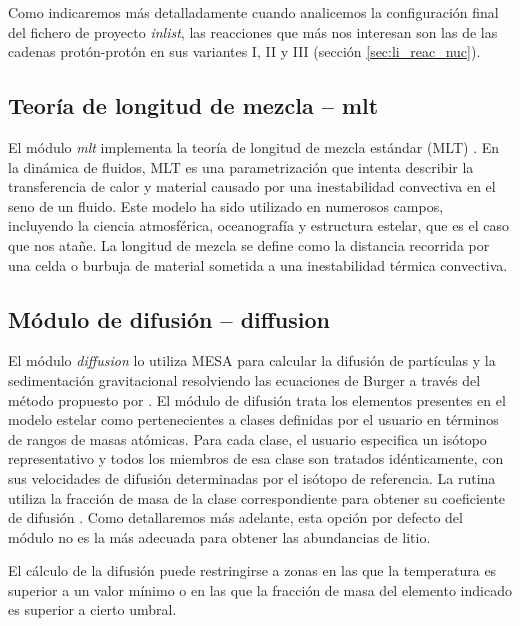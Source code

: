 Como indicaremos más detalladamente cuando analicemos la configuración final del fichero de proyecto \textit{inlist}, las reacciones que más nos interesan son las de las cadenas protón-protón en sus variantes I, II y III (sección \ref{sec:li_reac_nuc}).\par

\subsection{Teoría de longitud de mezcla – mlt}
El módulo \textit{mlt} implementa la teoría de longitud de mezcla estándar (MLT) \citep{Paxton2011}. En la dinámica de fluidos, MLT es una parametrización que intenta describir la transferencia de calor y material causado por una inestabilidad convectiva en el seno de un fluido. Este modelo ha sido utilizado en numerosos campos, incluyendo la ciencia atmosférica, oceanografía y estructura estelar, que es el caso que nos atañe. La longitud de mezcla se define como la distancia recorrida por una celda o burbuja de material sometida a una inestabilidad térmica convectiva.\par

\subsection{Módulo de difusión – diffusion} \label{subsec_diffusion}
El módulo \textit{diffusion} lo utiliza MESA para calcular la difusión de partículas y la sedimentación gravitacional resolviendo las ecuaciones de Burger \citep{Burgers1969} a través del método propuesto por \cite{Thoul1993}. El módulo de difusión trata los elementos presentes en el modelo estelar como pertenecientes a clases definidas por el usuario en términos de rangos de masas atómicas. Para cada clase, el usuario especifica un isótopo representativo y todos los miembros de esa clase son tratados idénticamente, con sus velocidades de difusión determinadas por el isótopo de referencia. La rutina utiliza la fracción de masa de la clase correspondiente para obtener su coeficiente de difusión \citep{Paxton2015}. Como detallaremos más adelante, esta opción por defecto del módulo no es la más adecuada para obtener las abundancias de litio.\par

El cálculo de la difusión puede restringirse a zonas en las que la temperatura es superior a un valor mínimo o en las que la fracción de masa del elemento indicado es superior a cierto umbral.\par

